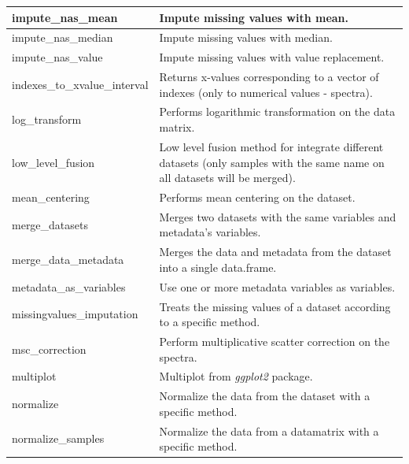 \begin{scriptsize}
\begin{longtable}{|m{4.3cm}|m{11cm}|}
		\hline
		impute\_nas\_mean & Impute missing values with mean. \\
		
		\hline
		impute\_nas\_median & Impute missing values with median. \\
		
		\hline
		impute\_nas\_value & Impute missing values with value replacement. \\
		
		\hline
		indexes\_to\_xvalue\_interval & Returns x-values corresponding to a vector of indexes (only to numerical values - spectra). \\
		
		\hline
		log\_transform & Performs logarithmic transformation on the data matrix. \\
		
		\hline
		low\_level\_fusion & Low level fusion method for integrate different datasets (only samples with the same name on all
		datasets will be merged). \\
		
		\hline
		mean\_centering & Performs mean centering on the dataset. \\
		
		\hline
		merge\_datasets & Merges two datasets with the same variables and metadata’s variables. \\
		
		\hline
		merge\_data\_metadata & Merges the data and metadata from the dataset into a single data.frame. \\
		
		\hline
		metadata\_as\_variables & Use one or more metadata variables as variables. \\
		
		\hline
		missingvalues\_imputation & Treats the missing values of a dataset according to a specific method. \\
		
		\hline
		msc\_correction & Perform multiplicative scatter correction on the spectra. \\
		
		\hline
		multiplot & Multiplot from \textit{ggplot2} package. \\
		
		\hline
		normalize & Normalize the data from the dataset with a specific method. \\
		
		\hline
		normalize\_samples & Normalize the data from a datamatrix with a specific method. \\
		

\end{longtable}
\end{scriptsize}
